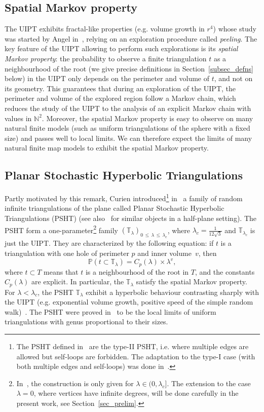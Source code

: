 \documentclass[10pt]{amsart}
\theoremstyle{definition}\newtheorem{defi}[theo]{Definition}\newtheorem{rema}[theo]{Remark}\newtheorem{exam}[theo]{Example}\newtheorem{exem}[theo]{Example}\newtheorem{nota}[theo]{Notation}
\newcommand{\TT}{\mathbb{T}}
\newcommand{\N}{\mathbb{N}}
\renewcommand{\P}{\mathbb{P}}
\begin{document}
\subsection*{Spatial Markov property}
The UIPT exhibits fractal-like properties (e.g. volume growth in $r^4$) whose study was started by Angel in~\cite{Ang03}, relying on an exploration procedure called \emph{peeling}. The key feature of the UIPT allowing to perform such explorations is its \emph{spatial Markov property}: the probability to observe a finite triangulation $t$ as a neighbourhood of the root (we give precise definitions in Section~\ref{subsec_defns} below) in the UIPT only depends on the perimeter and volume of $t$, and not on its geometry. This guarantees that during an exploration of the UIPT, the perimeter and volume of the explored region follow a Markov chain, which reduces the study of the UIPT to the analysis of an explicit Markov chain with values in $\N^2$. Moreover, the spatial Markov property is easy to observe on many natural finite models (such as uniform triangulations of the sphere with a fixed size) and passes well to local limits. We can therefore expect the limits of many natural finite map models to exhibit the spatial Markov property.

\subsection*{Planar Stochastic Hyperbolic Triangulations}
Partly motivated by this remark, Curien introduced\footnote{The PSHT defined in~\cite{CurPSHIT} are the type-II PSHT, i.e. where multiple edges are allowed but self-loops are forbidden. The adaptation to the type-I case (with both multiple edges and self-loops) was done in~\cite{B16}.} in~\cite{CurPSHIT} a family of random infinite triangulations of the plane called Planar Stochastic Hyperbolic Triangulations (PSHT) (see also~\cite{AR13} for similar objects in a half-plane setting). The PSHT form a one-parameter\footnote{In~\cite{CurPSHIT,B16}, the construction is only given for $\lambda \in (0,\lambda_c]$. The extension to the case $\lambda=0$, where vertices have infinite degrees, will be done carefully in the present work, see Section~\ref{sec_prelim}.} family $(\TT_{\lambda})_{0\,\leq\,\lambda\,\leq\,\lambda_c}$, where $\lambda_c=\frac{1}{12\sqrt{3}}$ and $\TT_{\lambda_c}$ is just the UIPT. They are characterized by the following equation: if $t$ is a triangulation with one hole of perimeter $p$ and inner volume~$v$, then
\[
\P \left(t \subset \TT_{\lambda} \right) = C_p(\lambda) \times \lambda^v,
\]
where $t \subset T$ means that $t$ is a neighbourhood of the root in $T$, and the constants $C_p(\lambda)$ are explicit. In particular, the $\TT_{\lambda}$ satisfy the spatial Markov property. For $\lambda<\lambda_c$, the PSHT $\TT_{\lambda}$ exhibit a hyperbolic behaviour contrasting sharply with the UIPT (e.g. exponential volume growth, positive speed of the simple random walk)~\cite{CurPSHIT}. The PSHT were proved in~\cite{BL19} to be the local limits of uniform triangulations with genus proportional to their sizes.
\end{document}
